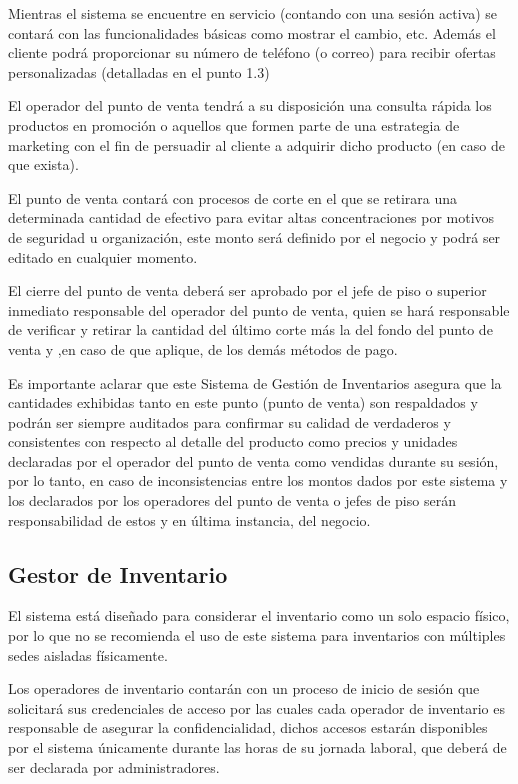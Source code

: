 \documentclass{article}
\begin{document}
Mientras el sistema se encuentre en servicio (contando con una sesión activa) se contará con las funcionalidades básicas como mostrar el cambio, etc. Además el cliente podrá proporcionar su número de teléfono (o correo) para recibir ofertas personalizadas (detalladas en el punto 1.3)

El operador del punto de venta tendrá a su disposición una consulta rápida los productos en promoción o aquellos que formen parte de una estrategia de marketing con el fin de persuadir al cliente a adquirir dicho producto (en caso de que exista).

El punto de venta contará con procesos de corte en el que se retirara una determinada cantidad de efectivo para evitar altas concentraciones por motivos de seguridad u organización, este monto será definido por el negocio y podrá ser editado en cualquier momento.

El cierre del punto de venta deberá ser aprobado por el jefe de piso o superior inmediato responsable del operador del punto de venta, quien se hará responsable de verificar y retirar la cantidad del último corte más la del fondo del punto de venta y ,en caso de que aplique, de los demás métodos de pago. 

Es importante aclarar que este Sistema de Gestión de Inventarios asegura que la cantidades exhibidas tanto en este punto (punto de venta) son respaldados y podrán ser siempre auditados para confirmar su calidad de verdaderos y consistentes con respecto al detalle del producto como precios y unidades declaradas por el operador del punto de venta como vendidas durante su sesión, por lo tanto, en caso de inconsistencias entre los montos dados por este sistema y los declarados por los operadores del punto de venta o jefes de piso serán responsabilidad de estos y en última instancia, del negocio.

\subsection{Gestor de Inventario}

El sistema está diseñado para considerar el inventario como un solo espacio físico, por lo que no se recomienda el uso de este sistema para inventarios con múltiples sedes aisladas físicamente. 

Los operadores de inventario contarán con un proceso de inicio de sesión que solicitará sus credenciales de acceso por las cuales cada operador de inventario es responsable de asegurar la confidencialidad, dichos accesos estarán disponibles por el sistema únicamente durante las horas de su jornada laboral, que deberá de ser declarada por administradores.
\end{document}
